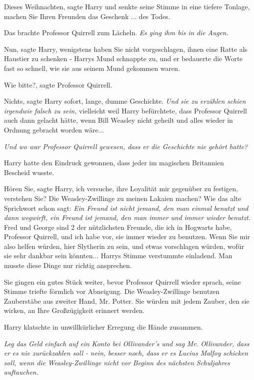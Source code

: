 \glqq{}Dieses Weihnachten\grqq{}, sagte Harry und senkte seine Stimme in eine
tiefere Tonlage, \glqq{}machen Sie Ihren Freunden das Geschenk ... des Todes.\grqq{}

Das brachte Professor Quirrell zum Lächeln.\emph{ Es ging ihm bis in die Augen.}

\glqq{}Nun\grqq{}, sagte Harry, \glqq{}wenigstens haben Sie nicht vorgeschlagen,
ihnen eine Ratte als Haustier zu schenken -\grqq{} Harrys Mund schnappte zu, und er
bedauerte die Worte fast so schnell, wie sie aus seinem Mund gekommen waren.

\glqq{}Wie bitte?\grqq{}, sagte Professor Quirrell.

\glqq{}Nichts\grqq{}, sagte Harry sofort, \glqq{}lange, dumme Geschichte.\grqq{}
\emph{Und sie zu erzählen schien irgendwie falsch zu sein,} vielleicht weil
Harry befürchtete, dass Professor Quirrell auch dann gelacht hätte, wenn Bill
Weasley nicht geheilt und alles wieder in Ordnung gebracht worden wäre...

\emph{Und wo war Professor Quirrell gewesen, dass er die Geschichte nie gehört
hatte?}

Harry hatte den Eindruck gewonnen, dass jeder im magischen Britannien Bescheid
wusste.

\glqq{}Hören Sie\grqq{}, sagte Harry, \glqq{}ich versuche, ihre Loyalität mir
gegenüber zu festigen, verstehen Sie? Die Weasley-Zwillinge zu meinen Lakaien
machen? Wie das alte Sprichwort schon sagt: \emph{Ein Freund ist nicht jemand,
den man einmal benutzt und dann wegwirft, ein Freund ist jemand, den man immer
und immer wieder benutzt.} Fred und George sind 2 der nützlichsten Freunde, die
ich in Hogwarts habe, Professor Quirrell, und ich habe vor, sie immer wieder zu
benutzen. Wenn Sie mir also helfen würden, hier Slytherin zu sein, und etwas
vorschlagen würden, wofür sie sehr dankbar sein könnten...\grqq{} Harrys Stimme
verstummte einladend. Man musste diese Dinge nur richtig ansprechen.

Sie gingen ein gutes Stück weiter, bevor Professor Quirrell wieder sprach, seine
Stimme triefte förmlich vor Abneigung. \glqq{}Die Weasley-Zwillinge benutzen
Zauberstäbe aus zweiter Hand, Mr. Potter. Sie würden mit jedem Zauber, den sie
wirken, an Ihre Großzügigkeit erinnert werden.\grqq{}

Harry klatschte in unwillkürlicher Erregung die Hände zusammen.

\emph{Leg das Geld einfach auf ein Konto bei Ollivander's und sag Mr.
Ollivander, dass er es nie zurückzahlen soll - nein, besser noch, dass er es
Lucius Malfoy schicken soll, wenn die Weasley-Zwillinge nicht vor Beginn des
nächsten Schuljahres auftauchen.}

